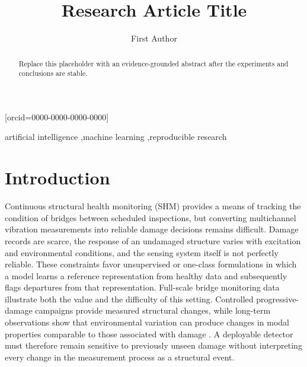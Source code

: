 \documentclass[a4paper,fleqn]{cas-sc}
\begin{document}

\title[mode=title]{Research Article Title}

\author[1]{First Author}[orcid=0000-0000-0000-0000]
\address[1]{organization={Institution Name},
             city={City},
             country={Country}}

\begin{abstract}
Replace this placeholder with an evidence-grounded abstract after the experiments and conclusions are stable.
\end{abstract}

\begin{keywords}
artificial intelligence \sep machine learning \sep reproducible research
\end{keywords}

\maketitle

\section{Introduction}
\label{sec:introduction}

Continuous structural health monitoring (SHM) provides a means of tracking the condition of bridges between scheduled inspections, but converting multichannel vibration measurements into reliable damage decisions remains difficult. Damage records are scarce, the response of an undamaged structure varies with excitation and environmental conditions, and the sensing system itself is not perfectly reliable. These constraints favor unsupervised or one-class formulations in which a model learns a reference representation from healthy data and subsequently flags departures from that representation. Full-scale bridge monitoring data illustrate both the value and the difficulty of this setting. Controlled progressive-damage campaigns provide measured structural changes, while long-term observations show that environmental variation can produce changes in modal properties comparable to those associated with damage \cite{peeters2001z24,maeck2003description,maeck2003damage}. A deployable detector must therefore remain sensitive to previously unseen damage without interpreting every change in the measurement process as a structural event.
\end{document}
